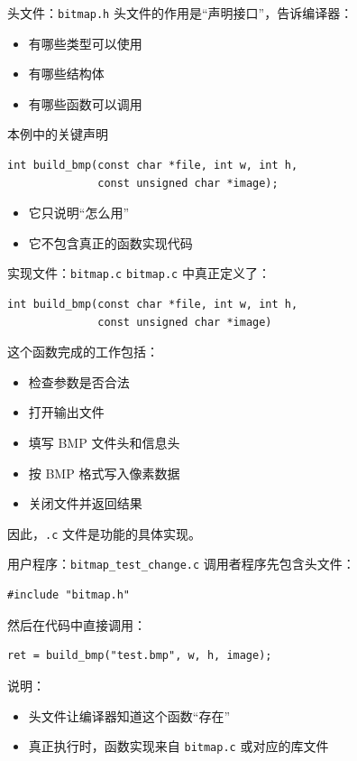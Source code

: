 \documentclass[aspectratio=169,11pt]{beamer}
\begin{document}
\begin{frame}[fragile]{头文件：\texttt{bitmap.h}}
头文件的作用是“\alert{声明接口}”，告诉编译器：
\begin{itemize}
  \item 有哪些类型可以使用
  \item 有哪些结构体
  \item 有哪些函数可以调用
\end{itemize}

\begin{block}{本例中的关键声明}
\begin{verbatim}
int build_bmp(const char *file, int w, int h,
              const unsigned char *image);
\end{verbatim}
\end{block}

\begin{itemize}
  \item 它只说明“怎么用”
  \item 它不包含真正的函数实现代码
\end{itemize}
\end{frame}

\begin{frame}[fragile]{实现文件：\texttt{bitmap.c}}
\texttt{bitmap.c} 中真正定义了：
\begin{verbatim}
int build_bmp(const char *file, int w, int h,
              const unsigned char *image)
\end{verbatim}

\vspace{0.4em}
这个函数完成的工作包括：
\begin{itemize}
  \item 检查参数是否合法
  \item 打开输出文件
  \item 填写 BMP 文件头和信息头
  \item 按 BMP 格式写入像素数据
  \item 关闭文件并返回结果
\end{itemize}

因此，\texttt{.c} 文件是功能的\alert{具体实现}。
\end{frame}

\begin{frame}[fragile]{用户程序：\texttt{bitmap\_test\_change.c}}
调用者程序先包含头文件：
\begin{verbatim}
#include "bitmap.h"
\end{verbatim}

然后在代码中直接调用：
\begin{verbatim}
ret = build_bmp("test.bmp", w, h, image);
\end{verbatim}

\vspace{0.5em}
说明：
\begin{itemize}
  \item 头文件让编译器知道这个函数“存在”
  \item 真正执行时，函数实现来自 \texttt{bitmap.c} 或对应的库文件
\end{itemize}
\end{frame}
\end{document}
